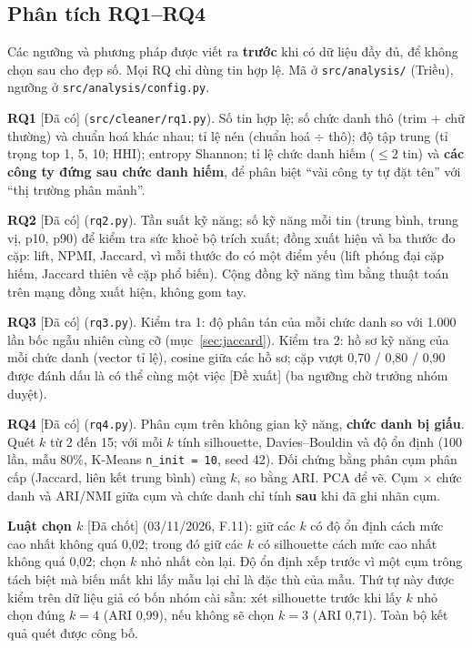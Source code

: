 \documentclass[12pt]{article}
\newcommand{\code}[1]{\texttt{#1}}
\newcommand{\dacoi}{\textsf{[Đã có]}}
\newcommand{\dachot}{\textsf{[Đã chốt]}}
\newcommand{\dexuat}{\textsf{[Đề xuất]}}
\begin{document}
\subsection{Phân tích RQ1--RQ4}
\label{sec:analysis}

Các ngưỡng và phương pháp được viết ra \textbf{trước} khi có dữ liệu đầy đủ, để không chọn sau cho đẹp số. Mọi RQ chỉ dùng tin hợp lệ. Mã ở \code{src/analysis/} (Triều), ngưỡng ở \code{src/analysis/config.py}.

\textbf{RQ1} \dacoi{} (\code{src/cleaner/rq1.py}). Số tin hợp lệ; số chức danh thô (trim + chữ thường) và chuẩn hoá khác nhau; tỉ lệ nén (chuẩn hoá $\div$ thô); độ tập trung (tỉ trọng top 1, 5, 10; HHI); entropy Shannon; tỉ lệ chức danh hiếm ($\le 2$ tin) và \textbf{các công ty đứng sau chức danh hiếm}, để phân biệt ``vài công ty tự đặt tên'' với ``thị trường phân mảnh''.

\textbf{RQ2} \dacoi{} (\code{rq2.py}). Tần suất kỹ năng; số kỹ năng mỗi tin (trung bình, trung vị, p10, p90) để kiểm tra sức khoẻ bộ trích xuất; đồng xuất hiện và ba thước đo cặp: lift, NPMI, Jaccard, vì mỗi thước đo có một điểm yếu (lift phóng đại cặp hiếm, Jaccard thiên về cặp phổ biến). Cộng đồng kỹ năng tìm bằng thuật toán trên mạng đồng xuất hiện, không gom tay.

\textbf{RQ3} \dacoi{} (\code{rq3.py}). Kiểm tra 1: độ phân tán của mỗi chức danh so với 1.000 lần bốc ngẫu nhiên cùng cỡ (mục~\ref{sec:jaccard}). Kiểm tra 2: hồ sơ kỹ năng của mỗi chức danh (vector tỉ lệ), cosine giữa các hồ sơ; cặp vượt 0,70 / 0,80 / 0,90 được đánh dấu là có thể cùng một việc \dexuat{} (ba ngưỡng chờ trưởng nhóm duyệt).

\textbf{RQ4} \dacoi{} (\code{rq4.py}). Phân cụm trên không gian kỹ năng, \textbf{chức danh bị giấu}. Quét $k$ từ 2 đến 15; với mỗi $k$ tính silhouette, Davies--Bouldin và độ ổn định (100 lần, mẫu 80\%, K-Means \code{n\_init = 10}, seed 42). Đối chứng bằng phân cụm phân cấp (Jaccard, liên kết trung bình) cùng $k$, so bằng ARI. PCA để vẽ. Cụm $\times$ chức danh và ARI/NMI giữa cụm và chức danh chỉ tính \textbf{sau} khi đã ghi nhãn cụm.

\textbf{Luật chọn $k$} \dachot{} (03/11/2026, F.11): giữ các $k$ có độ ổn định cách mức cao nhất không quá 0,02; trong đó giữ các $k$ có silhouette cách mức cao nhất không quá 0,02; chọn $k$ nhỏ nhất còn lại. Độ ổn định xếp trước vì một cụm trông tách biệt mà biến mất khi lấy mẫu lại chỉ là đặc thù của mẫu. Thứ tự này được kiểm trên dữ liệu giả có bốn nhóm cài sẵn: xét silhouette trước khi lấy $k$ nhỏ chọn đúng $k = 4$ (ARI 0,99), nếu không sẽ chọn $k = 3$ (ARI 0,71). Toàn bộ kết quả quét được công bố.
\end{document}
